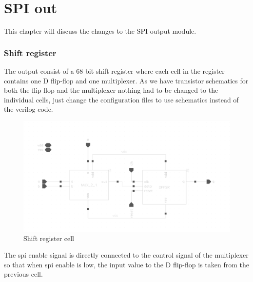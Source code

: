 
 \newpage
\section{SPI out}
This chapter will discuss the changes to the SPI output module.


\subsubsection{Shift register}
The output consist of a 68 bit shift register where each cell in the register contains one D flip-flop and one multiplexer. As we have transistor schematics for both the flip flop and the multiplexer nothing had to be changed to the individual cells, just change the configuration files to use schematics instead of the verilog code. 

\begin{figure}[H]
\centering
\captionsetup{justification=centering}
\includegraphics[scale=0.2]{../figures/mux_dffsr.png}
\caption{Shift register cell}
\label{mux_dff}
\end{figure}

\raggedright The spi enable signal is directly connected to the control signal of the multiplexer so that when spi enable is low, the input value to the D flip-flop is taken from the previous cell. 
 


\newpage

